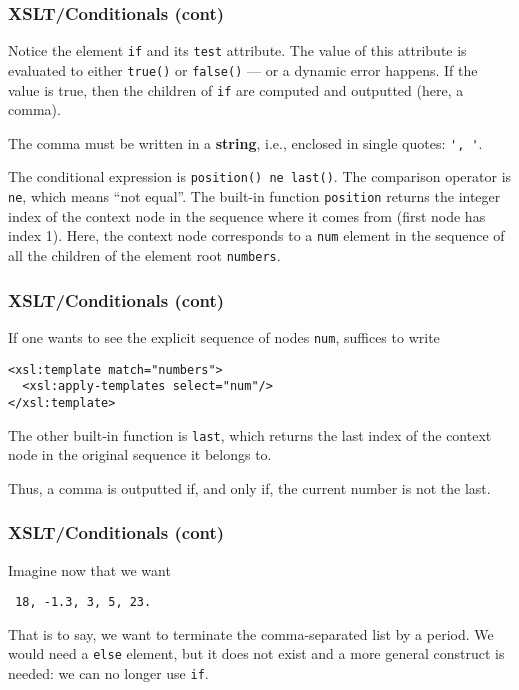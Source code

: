 %
\begin{frame}[containsverbatim]
\frametitle{XSLT/Conditionals (cont)}

Notice the \XSLT element \texttt{if} and its \texttt{test}
attribute. The value of this attribute is evaluated to either
\texttt{true()} or \texttt{false()} --- or a dynamic error happens. If
the value is true, then the children of \texttt{if} are computed and
outputted (here, a comma).

\bigskip

The comma must be written in a \textbf{string}, i.e., enclosed in
single quotes: \verb|', '|.

\bigskip

The conditional expression is \texttt{position() ne last()}. The
comparison operator is \texttt{ne}, which means ``not equal''. The
built-in function \texttt{position} returns the integer index of
the context node in the sequence where it comes from (first node has
index 1). Here, the context node corresponds to a \texttt{num} element
in the sequence of all the children of the element root
\texttt{numbers}.

\end{frame}

%
\begin{frame}[containsverbatim]
\frametitle{XSLT/Conditionals (cont)}

If one wants to see the explicit sequence of nodes \texttt{num},
suffices to write
{\small
\begin{verbatim}
<xsl:template match="numbers">
  <xsl:apply-templates select="num"/>
</xsl:template>
\end{verbatim}
}
The other built-in function is \texttt{last}, which returns the
last index of the context node in the original sequence it belongs
to.

\bigskip

Thus, a comma is outputted if, and only if, the current number is not
the last.

\end{frame}

%
\begin{frame}
\frametitle{XSLT/Conditionals (cont)}

Imagine now that we want
\begin{center}\tt
18, -1.3, 3, 5, 23.
\end{center}
That is to say, we want to terminate the comma-separated list by
a period. We would need a \texttt{else} element, but it does not exist
and a more general construct is needed: we can no longer use
\texttt{if}.

\end{frame}

